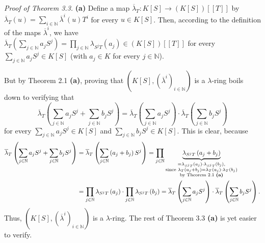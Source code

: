 \documentclass[numbers=enddot,12pt,final,onecolumn,notitlepage]{scrartcl}%
\begin{document}
\textit{Proof of Theorem 3.3.} \textbf{(a)} Define a map $\overline{\lambda
}_{T}:K\left[  S\right]  \rightarrow\left(  K\left[  S\right]  \right)
\left[  \left[  T\right]  \right]  $ by $\overline{\lambda}_{T}\left(
u\right)  =\sum\limits_{i\in\mathbb{N}}\overline{\lambda}^{i}\left(  u\right)
T^{i}$ for every $u\in K\left[  S\right]  $. Then, according to the definition
of the maps $\overline{\lambda}^{i}$, we have $\overline{\lambda}_{T}\left(
\sum\limits_{j\in\mathbb{N}}a_{j}S^{j}\right)  =\prod\limits_{j\in\mathbb{N}%
}\lambda_{S^{j}T}\left(  a_{j}\right)  \in\left(  K\left[  S\right]  \right)
\left[  \left[  T\right]  \right]  $ for every $\sum\limits_{j\in\mathbb{N}%
}a_{j}S^{j}\in K\left[  S\right]  $ (with $a_{j}\in K$ for every
$j\in\mathbb{N}$).

But by Theorem 2.1 \textbf{(a)}, proving that $\left(  K\left[  S\right]
,\left(  \overline{\lambda}^{i}\right)  _{i\in\mathbb{N}}\right)  $ is a
$\lambda$-ring boils down to verifying that%
\[
\overline{\lambda}_{T}\left(  \sum\limits_{j\in\mathbb{N}}a_{j}S^{j}%
+\sum\limits_{j\in\mathbb{N}}b_{j}S^{j}\right)  =\overline{\lambda}_{T}\left(
\sum\limits_{j\in\mathbb{N}}a_{j}S^{j}\right)  \cdot\overline{\lambda}%
_{T}\left(  \sum\limits_{j\in\mathbb{N}}b_{j}S^{j}\right)
\]
for every $\sum\limits_{j\in\mathbb{N}}a_{j}S^{j}\in K\left[  S\right]  $ and
$\sum\limits_{j\in\mathbb{N}}b_{j}S^{j}\in K\left[  S\right]  $. This is
clear, because%
\begin{align*}
\overline{\lambda}_{T}\left(  \sum\limits_{j\in\mathbb{N}}a_{j}S^{j}%
+\sum\limits_{j\in\mathbb{N}}b_{j}S^{j}\right)   &  =\overline{\lambda}%
_{T}\left(  \sum\limits_{j\in\mathbb{N}}\left(  a_{j}+b_{j}\right)
S^{j}\right)  =\prod\limits_{j\in\mathbb{N}}\underbrace{\lambda_{S^{j}%
T}\left(  a_{j}+b_{j}\right)  }_{\substack{=\lambda_{S^{j}T}\left(
a_{j}\right)  \cdot\lambda_{S^{j}T}\left(  b_{j}\right)  ,\\\text{since
}\lambda_{T}\left(  a_{j}+b_{j}\right)  =\lambda_{T}\left(  a_{j}\right)
\cdot\lambda_{T}\left(  b_{j}\right)  \\\text{by Theorem 2.1 \textbf{(a)}}}}\\
&  =\prod\limits_{j\in\mathbb{N}}\lambda_{S^{j}T}\left(  a_{j}\right)
\cdot\prod\limits_{j\in\mathbb{N}}\lambda_{S^{j}T}\left(  b_{j}\right)
=\overline{\lambda}_{T}\left(  \sum\limits_{j\in\mathbb{N}}a_{j}S^{j}\right)
\cdot\overline{\lambda}_{T}\left(  \sum\limits_{j\in\mathbb{N}}b_{j}%
S^{j}\right)  .
\end{align*}
Thus, $\left(  K\left[  S\right]  ,\left(  \overline{\lambda}^{i}\right)
_{i\in\mathbb{N}}\right)  $ is a $\lambda$-ring. The rest of Theorem 3.3
\textbf{(a)} is yet easier to verify.
\end{document}
